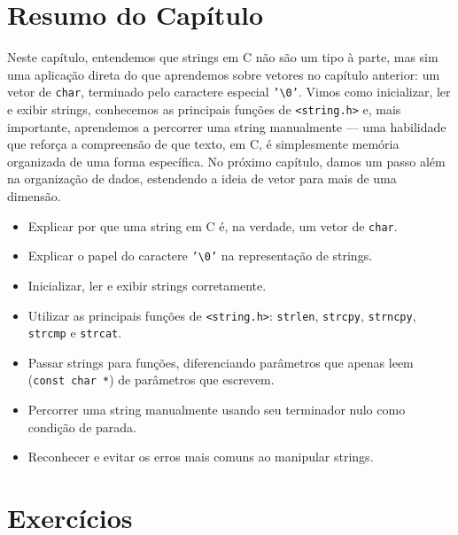 \documentclass[12pt,a4paper,oneside]{extreport}
\begin{document}
\section*{Resumo do Capítulo}
Neste capítulo, entendemos que strings em C não são um tipo à parte, mas sim uma aplicação direta do que aprendemos sobre vetores no capítulo anterior: um vetor de \texttt{char}, terminado pelo caractere especial \texttt{'\textbackslash 0'}. Vimos como inicializar, ler e exibir strings, conhecemos as principais funções de \texttt{<string.h>} e, mais importante, aprendemos a percorrer uma string manualmente — uma habilidade que reforça a compreensão de que texto, em C, é simplesmente memória organizada de uma forma específica. No próximo capítulo, damos um passo além na organização de dados, estendendo a ideia de vetor para mais de uma dimensão.

\begin{objetivos}
\begin{itemize}
    \item Explicar por que uma string em C é, na verdade, um vetor de \texttt{char}.
    \item Explicar o papel do caractere \texttt{'\textbackslash 0'} na representação de strings.
    \item Inicializar, ler e exibir strings corretamente.
    \item Utilizar as principais funções de \texttt{<string.h>}: \texttt{strlen}, \texttt{strcpy}, \texttt{strncpy}, \texttt{strcmp} e \texttt{strcat}.
    \item Passar strings para funções, diferenciando parâmetros que apenas leem (\texttt{const char *}) de parâmetros que escrevem.
    \item Percorrer uma string manualmente usando seu terminador nulo como condição de parada.
    \item Reconhecer e evitar os erros mais comuns ao manipular strings.
\end{itemize}
\end{objetivos}

\section*{Exercícios}
\end{document}
